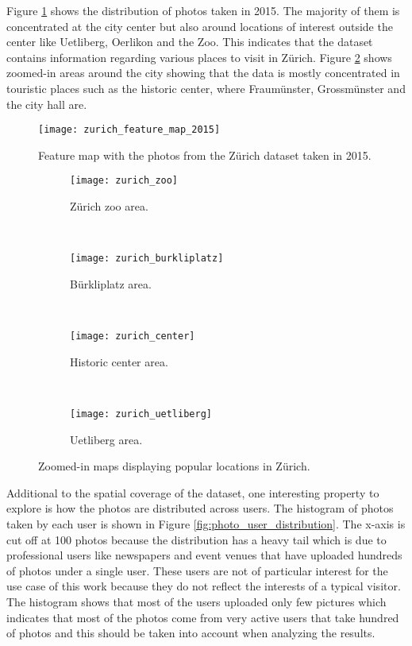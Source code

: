 Figure \ref{fig:heatmap_zurich} shows the distribution of photos taken in 2015. The majority of them is concentrated at the city center but also around locations of interest outside the center like Uetliberg, Oerlikon and the Zoo. This indicates that the dataset contains information regarding various places to visit in Zürich. Figure \ref{fig:heatmap_zurich_zoom} shows zoomed-in areas around the city showing that the data is mostly concentrated in touristic places such as the historic center, where Fraumünster, Grossmünster and the city hall are.

\begin{figure}
  \centering
  \texttt{[image: zurich\_feature\_map\_2015]}
  \caption{Feature map with the photos from the Zürich dataset taken in 2015.}
  \label{fig:heatmap_zurich}
\end{figure}

\begin{figure}
  \centering
  \begin{subfigure}[b]{0.45\textwidth}
    \texttt{[image: zurich\_zoo]}
    \caption{Zürich zoo area.}
  \end{subfigure}
  ~
  \begin{subfigure}[b]{0.45\textwidth}
    \texttt{[image: zurich\_burkliplatz]}
    \caption{Bürkliplatz area.}
  \end{subfigure}
  \hfill \\
  \begin{subfigure}[b]{0.45\textwidth}
    \texttt{[image: zurich\_center]}
    \caption{Historic center area.}
  \end{subfigure}
  ~
  \begin{subfigure}[b]{0.45\textwidth}
    \texttt{[image: zurich\_uetliberg]}
    \caption{Uetliberg area.}
  \end{subfigure}
  \caption{Zoomed-in maps displaying popular locations in Zürich.}
  \label{fig:heatmap_zurich_zoom}
\end{figure}

Additional to the spatial coverage of the dataset, one interesting property to explore is how the photos are distributed across users. The histogram of photos taken by each user is shown in Figure \ref{fig:photo_user_distribution}. The x-axis is cut off at 100 photos because the distribution has a heavy tail which is due to professional users like newspapers and event venues that have uploaded hundreds of photos under a single user. These users are not of particular interest for the use case of this work because they do not reflect the interests of a typical visitor. The histogram shows that most of the users uploaded only few pictures which indicates that most of the photos come from very active users that take hundred of photos and this should be taken into account when analyzing the results.

